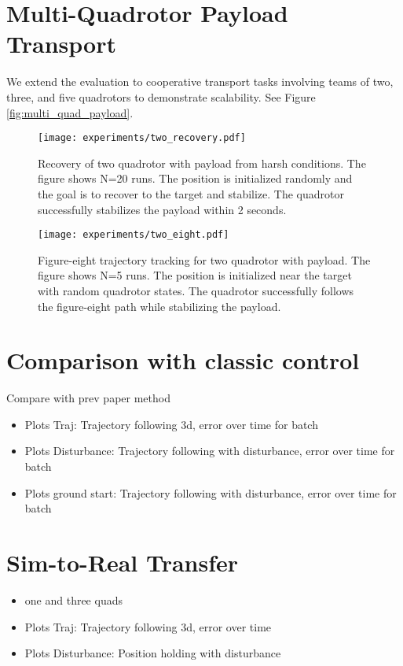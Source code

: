 \section{Multi-Quadrotor Payload Transport}
We extend the evaluation to cooperative transport tasks involving teams of two, three, and five quadrotors to demonstrate scalability. See Figure \ref{fig:multi_quad_payload}.

\begin{figure}[ht]
    \centering
    \texttt{[image: experiments/two\_recovery.pdf]}
    \caption{Recovery of two quadrotor with payload from harsh conditions. The figure shows N=20 runs. The position is initialized randomly and the goal is to recover to the target and stabilize. The quadrotor successfully stabilizes the payload within 2 seconds.}
    \label{fig:payload_error_over_time}
\end{figure}
\begin{figure}[ht]
    \centering
    
    \texttt{[image: experiments/two\_eight.pdf]}
    \caption{Figure-eight trajectory tracking for two quadrotor with payload. The figure shows N=5 runs. The position is initialized near the target with random quadrotor states. The quadrotor successfully follows the figure-eight path while stabilizing the payload.}
    \label{fig:payload_error_over_time}
\end{figure}

\section{Comparison with classic control}
Compare with prev paper method \autocite{Wahba2024}
\begin{itemize}
    \item Plots Traj: Trajectory following 3d, error over time for batch
    \item Plots Disturbance: Trajectory following with disturbance, error over time for batch
    \item Plots ground start: Trajectory following with disturbance, error over time for batch
\end{itemize} 
\section{Sim-to-Real Transfer}
\begin{itemize}
    \item one and three quads
    \item Plots Traj: Trajectory following 3d,  error over time 
    \item Plots Disturbance: Position holding with disturbance
\end{itemize}

